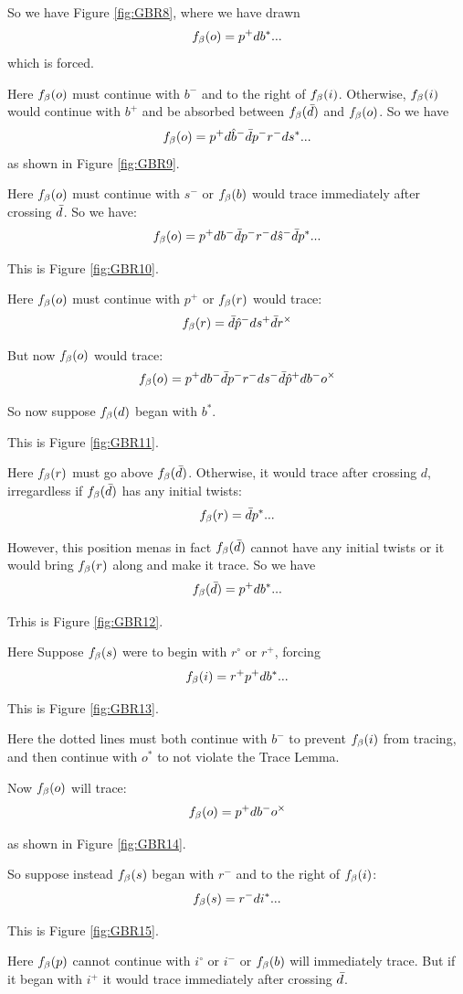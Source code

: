 So we have Figure \ref{fig:GBR8}, where we have drawn 
\[
f_\beta(o) = p^+ d b^*...
\]
which is forced.

Here $f_\beta(o)$ must continue with $b^-$ and to the right of $f_\beta(i)$. Otherwise, $f_\beta(i)$ would continue with $b^+$ and  be absorbed between $f_\beta(\bar{d})$ and $f_\beta(o)$. So we have
\[
f_\beta(o) = p^+ d \hat{b}^- \bar{d} p^- r^- d s^*...
\]
as shown in Figure \ref{fig:GBR9}. 

Here $f_\beta(o)$ must continue with $s^-$ or $f_\beta(b)$ would trace immediately after crossing $\bar{d}$. So we have:
\[
f_\beta(o) = p^+ d b^- \bar{d} p^- r^- d \hat{s}^-\bar{d} p^*...
\]

This is Figure \ref{fig:GBR10}. 

Here $f_\beta(o)$ must continue with $p^+$ or $f_\beta(r)$ would trace:
\[
f_\beta(r) = \bar{d} \hat{p}^- d s^+ \bar{d} r^\times
\]

But now $f_\beta(o)$ would trace:
\[
f_\beta(o) = p^+ d b^- \bar{d} p^- r^- d s^-\bar{d} \hat{p}^+ d b^- o^\times
\]


So now suppose $f_\beta(d)$ began with $b^*$. 

This is Figure \ref{fig:GBR11}.

Here $f_\beta(r)$ must go above $f_\beta(\bar{d})$. Otherwise, it would trace after crossing $d$, irregardless if $f_\beta(\bar{d})$ has any initial twists:
\[
f_\beta(r) = \bar{d} p^*...
\]

However, this position menas in fact $f_\beta(\bar{d})$ cannot have any initial twists or it would bring $f_\beta(r)$ along and make it trace. So we have
\[
f_\beta(\bar{d}) = p^+ d b^*...
\]

Trhis is Figure \ref{fig:GBR12}.

Here Suppose $f_\beta(s)$ were to begin with $r^\circ$ or $r^+$, forcing
\[
f_\beta(i) = r^+ p^+ d b^*...
\]

This is Figure \ref{fig:GBR13}.

Here the dotted lines must both continue with $b^-$ to prevent $f_\beta(i)$ from tracing, and then continue with $o^*$ to not violate the Trace Lemma.

Now $f_\beta(o)$ will trace:
\[
f_\beta(o) = p^+ d b^- o^\times
\]

as shown in Figure \ref{fig:GBR14}.

So suppose instead $f_\beta(s)$ began with $r^-$ and to the right of $f_\beta(i)$:
\[
f_\beta(s) = r^- d i^*...
\]

This is Figure \ref{fig:GBR15}.

Here $f_\beta(p)$ cannot continue with $i^\circ$ or $i^-$ or $f_\beta(b)$ will immediately trace. But if it began with $i^+$ it would trace immediately after crossing $\bar{d}$.

